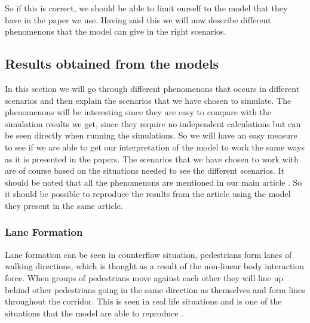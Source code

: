 So if this is correct, we should be able to limit ourself to the model that they have in the paper we use.
Having said this we will now describe different phenomenons that the model can give in the right scenarios.  




\subsection{Results obtained from the models}
In this section we will go through different phenomenons that occurs in different scenarios and then
explain the scenarios that we have chosen to simulate. The phenomenons will be interesting since they
are easy to compare with the simulation results we get, since they require no independent calculations
but can be seen directly when running the simulations. So we will have an easy measure to see if we
are able to get our interpretation of the model to work the same ways as it is presented in the papers.
The scenarios that we have chosen to work with are of course based on the situations needed to see the
different scenarios. It should be noted that all the phenomenons are mentioned in our main article \cite{self-org}.
So it should be possible to reproduce the results from the article using the model they present in the same article. 

\subsubsection{Lane Formation}
Lane formation can be seen in counterflow situation, pedestrians form lanes of walking 
directions, which is thought as a result of the non-linear body interaction 
force. When groups of pedestrians move against each other they will line up behind other
pedestrians going in the same direction as themselves and form lines throughout the corridor.
This is seen in real life situations and is one of the situations that the model are able to reproduce \cite{self-org}. 

